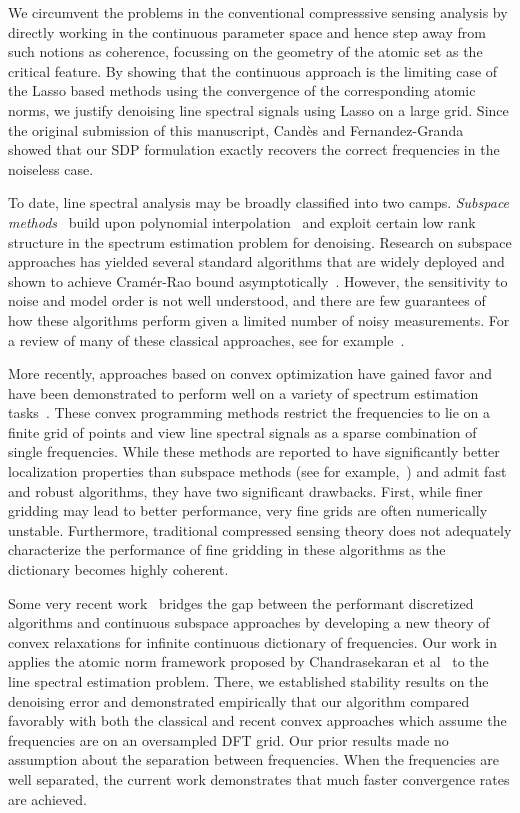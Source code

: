 We circumvent the problems in the conventional compresssive sensing analysis by
directly working in the continuous parameter space and hence step away from
such notions as coherence, focussing on the geometry of the atomic set as the
critical feature. By showing that the continuous approach is the limiting
case of  the Lasso based methods using the convergence of the corresponding
atomic norms, we justify denoising line spectral signals using Lasso on a
large grid. Since the original submission of this manuscript,
Cand\`es and Fernandez-Granda~\cite{CandesGranda} showed that our SDP
formulation exactly recovers the correct frequencies in the noiseless case.

To date, line spectral analysis may be broadly classified into two camps.
\emph{Subspace methods}~\cite{music,esprit,cadzow05,ssa} build upon polynomial
interpolation~\cite{prony1795} and exploit certain low rank structure in the
spectrum estimation problem for denoising. Research on subspace approaches has
yielded several standard algorithms that are widely deployed and shown to
achieve Cram\'{e}r-Rao bound asymptotically~\cite{fri,cramer-subspace}.
However, the sensitivity to noise and model order is not well understood, and
there are few guarantees of how these algorithms perform given a limited number
of noisy measurements. For a review of many of these classical approaches, see
for example~\cite{StoicaMoses}.

More recently, approaches based on convex optimization have gained favor and
have been demonstrated to perform well on a variety of spectrum estimation
tasks~\cite{malioutov05,bourguignon2007irregular,baraniuk2010model,zweig2003irregular}. These convex programming methods restrict the frequencies to lie on a
finite grid of points and view line spectral signals as a sparse combination of
single frequencies. While these methods are reported to have significantly
better localization properties than subspace methods (see for
example,~\cite{malioutov05}) and admit fast and robust algorithms, they have
two significant drawbacks. First, while finer gridding may lead to better
performance, very fine grids are often numerically unstable. Furthermore,
traditional compressed sensing theory does not adequately characterize the
performance of fine gridding in these algorithms as the dictionary becomes
highly coherent.

Some very recent work~\cite{btr12,cg_exact12,cg_noisy} bridges the gap between
the performant discretized algorithms and continuous subspace approaches by
developing a new theory of convex relaxations for infinite continuous
dictionary of frequencies. Our work in~\cite{btr12} applies the atomic norm
framework proposed by Chandrasekaran et al~\cite{crpw} to the line spectral
estimation problem. There, we established stability results on the denoising
error and demonstrated empirically that our algorithm compared favorably with
both the classical and recent convex approaches which assume the frequencies
are on an oversampled DFT grid. Our prior results made no assumption about the
separation between frequencies. When the frequencies are well separated, the
current work demonstrates that much faster convergence rates are achieved.


